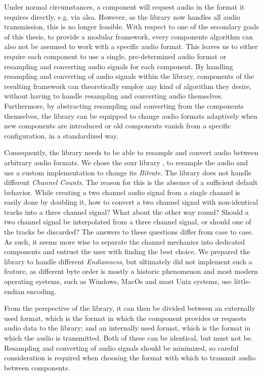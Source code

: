 Under normal circumstances, a component will request audio in the format it requires directly, e.g. via \gls{alsa}.
However, as the library now handles all audio transmission, this is no longer feasible.
With respect to one of the secondary goals of this thesis, to provide a modular framework, every components algorithm can also not be assumed to work with a specific audio format.
This leaves us to either require each component to use a single, pre-determined audio format or resampling and converting audio signals for each component.
By handling resampling and converting of audio signals within the library, components of the resulting framework can theoretically employ any kind of algorithm they desire, without having to handle resampling and converting audio themselves.
Furthermore, by abstracting resampling and converting from the components themselves, the library can be equipped to change audio formats adaptively when new components are introduced or old components vanish from a specific configuration, in a standardized way.

Consequently, the library needs to be able to resample and convert audio between arbitrary audio formats.
We chose the \gls{soxr} library \cite{soxr,soxrbase}, to resample the audio and use a custom implementation to change its \textit{Bitrate}.
The library does not handle different \textit{Channel Counts}.
The reason for this is the absence of a sufficient default behavior.
While creating a two channel audio signal from a single channel is easily done by doubling it, how to convert a two channel signal with non-identical tracks into a three channel signal?
What about the other way round?
Should a two channel signal be interpolated from a three channel signal, or should one of the tracks be discarded?
The answers to these questions differ from case to case.
As such, it seems more wise to separate the channel mechanics into dedicated components and entrust the user with finding the best choice. 
We prepared the library to handle different \textit{Endianness}, but ultimately did not implement such a feature, as different byte order is mostly a historic phenomenon and most modern operating systems, such as Windows, MacOs and most Unix systems, use little-endian encoding.

From the perspective of the library, it can then be divided between an externally used format, which is the format in which the component provides or requests audio data to the library; and an internally used format, which is the format in which the audio is transmitted.
Both of these can be identical, but must not be.
Resampling and converting of audio signals should be minimized, so careful consideration is required when choosing the format with which to transmit audio between components.


